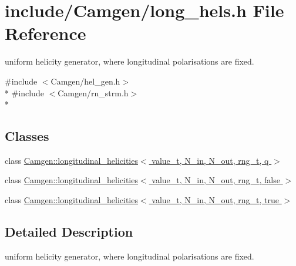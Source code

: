 \hypertarget{a00662}{\section{include/\-Camgen/long\-\_\-hels.h File Reference}
\label{a00662}
}


uniform helicity generator, where longitudinal polarisations are fixed.  


{\ttfamily \#include $<$Camgen/hel\-\_\-gen.\-h$>$}\\*
{\ttfamily \#include $<$Camgen/rn\-\_\-strm.\-h$>$}\\*
\subsection*{Classes}
\begin{DoxyCompactItemize}
\item 
class \hyperlink{a00327}{Camgen\-::longitudinal\-\_\-helicities$<$ value\-\_\-t, N\-\_\-in, N\-\_\-out, rng\-\_\-t, q $>$}
\item 
class \hyperlink{a00328}{Camgen\-::longitudinal\-\_\-helicities$<$ value\-\_\-t, N\-\_\-in, N\-\_\-out, rng\-\_\-t, false $>$}
\item 
class \hyperlink{a00329}{Camgen\-::longitudinal\-\_\-helicities$<$ value\-\_\-t, N\-\_\-in, N\-\_\-out, rng\-\_\-t, true $>$}
\end{DoxyCompactItemize}


\subsection{Detailed Description}
uniform helicity generator, where longitudinal polarisations are fixed. 